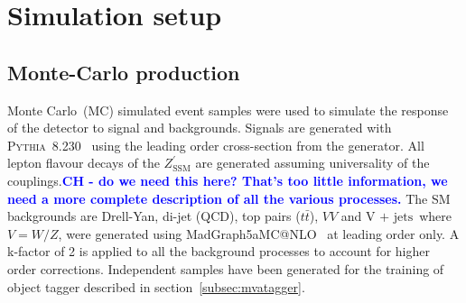 \documentclass[a4paper,11pt]{article}
\makeatletter
\newcommand{\CH}[1] {\textbf{\textcolor{blue}{CH - #1}}}
\newcommand{\ZpSSM}{\ensuremath{Z^{\prime}_{\mathrm{SSM}}}}
\newcommand*{\vj}{\ensuremath{\text{V + jets}}}
\newcommand*{\ttbar}{\ensuremath{t\bar{t}}}
\newcommand{\amc}{{\sc MadGraph5\textunderscore}a{\sc MC@NLO}}
\makeatother
\begin{document}
\section{Simulation setup}
\label{sec:simulation}

\subsection{Monte-Carlo production}
\label{subsec:mcprod}

Monte Carlo~(MC) simulated event samples were used to simulate the response of the detector to signal and backgrounds. Signals are generated with {\scshape Pythia}~8.230~\cite{Sjostrand:2014zea} using the leading order cross-section from the generator.
All lepton flavour decays of the $\ZpSSM$ are generated assuming universality of the couplings.\CH{do we need this here? That's too little information, we need a more complete description of all the various processes.}
The SM backgrounds are Drell-Yan, di-jet (QCD), top pairs (\ttbar), $VV$ and \vj\ where $V=W/Z$,  were generated using \amc~\cite{Alwall:2014hca} at leading order only. A k-factor of 2 is applied to all the background processes to account for higher order corrections.
Independent samples have been generated for the training of object tagger described in section~\ref{subsec:mvatagger}.

\end{document}
